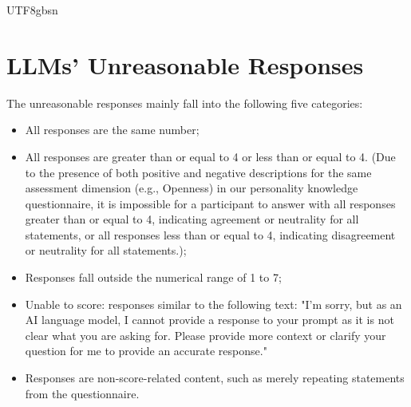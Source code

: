 \documentclass{article}
\theoremstyle{plain}
\theoremstyle{definition}
\theoremstyle{remark}
\begin{document}
\begin{CJK*}{UTF8}{gbsn}




\newpage
\appendix
\onecolumn
\section{LLMs' Unreasonable Responses}\label{ap-ur}
The unreasonable responses mainly fall into the following five categories:
\begin{itemize}
    \item All responses are the same number;
    \item All responses are greater than or equal to 4 or less than or equal to 4. (Due to the presence of both positive and negative descriptions for the same assessment dimension (e.g., Openness) in our personality knowledge questionnaire, it is impossible for a participant to answer with all responses greater than or equal to 4, indicating agreement or neutrality for all statements, or all responses less than or equal to 4, indicating disagreement or neutrality for all statements.);
    \item Responses fall outside the numerical range of 1 to 7;
    \item Unable to score: responses similar to the following text: "I'm sorry, but as an AI language model, I cannot provide a response to your prompt as it is not clear what you are asking for. Please provide more context or clarify your question for me to provide an accurate response."
    \item Responses are non-score-related content, such as merely repeating statements from the questionnaire.
\end{itemize}



\end{CJK*}
\end{document}
